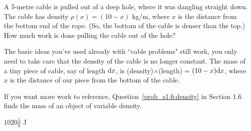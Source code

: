 \begin{Mquestion}
A 5-metre cable is pulled out of a deep hole, where it was dangling straight down. The cable has density $\rho(x) = (10-x)$ kg/m, where $x$ is the distance from the bottom end of the rope. (So, the bottom of the cable is denser than the top.) How much work is done pulling the cable out of the hole?
\end{Mquestion}
\begin{hint}
The basic ideas you've used already with ``cable problems"  still work, you only need to take care that the density of the cable is no longer constant. The mass of a tiny piece of cable, say of length $\mathrm{d}x$, is (density)$\times$(length) = $(10-x)\mathrm{d}x$, where $x$ is the distance of our piece from the bottom of the cable.

If you want more work to reference, Question~\ref{prob_s1.6:density} in Section 1.6 finds the mass of an object of variable density.
\end{hint}
\begin{answer}
$1020\frac{5}{6}$ J
\end{answer}
